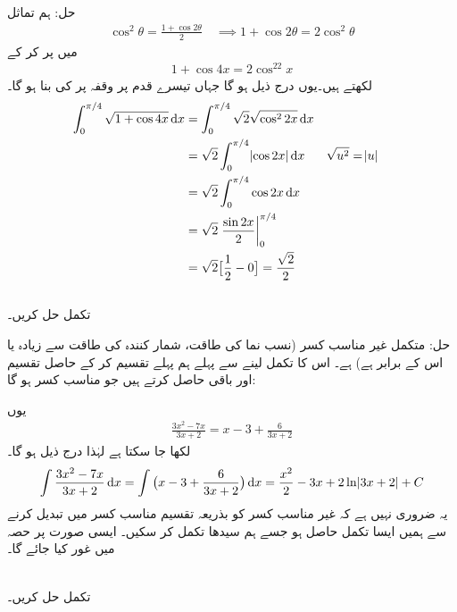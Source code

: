 حل:\quad
ہم تماثل
\begin{align*}
\cos^2\theta=\frac{1+\cos 2\theta}{2}\quad \implies 1+\cos 2\theta=2\cos^2\theta
\end{align*}
میں  پر کر کے 
\begin{align*}
1+\cos 4x=2\cos^22x
\end{align*}
لکھتے ہیں۔یوں درج ذیل ہو گا جہاں تیسرے قدم پر وقفہ  پر  کی بنا  ہو گا۔
\begin{align*}
\int_0^{\pi/4}\sqrt{1+\cos 4x}\dif x&=\int_0^{\pi/4}\sqrt{2}\sqrt{\cos^22x}\dif x\\
&=\sqrt{2}\int_0^{\pi/4}\abs{\cos 2x}\dif x&&\sqrt{u^2}=\abs{u}\\
&=\sqrt{2}\int_0^{\pi/4}\cos 2x\dif x\\
&=\sqrt{2}\left.\frac{\sin 2x}{2}\right\vert_0^{\pi/4}\\
&=\sqrt{2}\big[\frac{1}{2}-0\big]=\frac{\sqrt{2}}{2}
\end{align*}
\\
تکمل  حل کریں۔

حل:\quad 
متکمل غیر مناسب کسر (نسب نما کی طاقت، شمار کنندہ کی طاقت سے زیادہ یا اس کے برابر ہے)  ہے۔ اس کا تکمل لینے سے پہلے ہم پہلے تقسیم کر کے حاصل تقسیم اور باقی حاصل کرتے ہیں جو مناسب کسر ہو گا:
\begin{center}
\end{center}
یوں
\begin{align*}
\frac{3x^2-7x}{3x+2}=x-3+\frac{6}{3x+2}
\end{align*}
لکھا جا سکتا ہے لہٰذا درج ذیل ہو گا۔
\begin{align*}
\int\frac{3x^2-7x}{3x+2}\dif x=\int\big(x-3+\frac{6}{3x+2}\big)\dif x=\frac{x^2}{2}-3x+2\ln\abs{3x+2}+C
\end{align*}
یہ ضروری نہیں ہے کہ غیر مناسب کسر کو بذریعہ تقسیم مناسب  کسر میں تبدیل کرنے سے  ہمیں ایسا تکمل حاصل ہو جسے ہم سیدھا تکمل کر سکیں۔ ایسی صورت پر حصہ   میں غور کیا جائے گا۔

\\
تکمل  حل کریں۔

